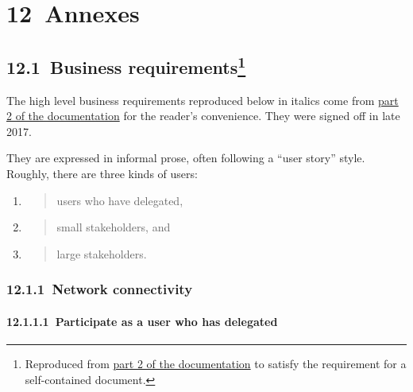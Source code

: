 \documentclass[]{article}
\let\oldparagraph\paragraph
\renewcommand{\paragraph}[1]{\oldparagraph{#1}\mbox{}}
\begin{document}
\hypertarget{annexes}{%
\section{​12​~Annexes}\label{annexes}}

\hypertarget{business-requirements}{%
\subsection[​12.1​~Business
requirements]{\texorpdfstring{​12.1​~Business requirements\footnote{Reproduced
  from
  \href{https://github.com/input-output-hk/ouroboros-network-docs/blob/master/technical-report/network.pdf}{{part
  2 of the documentation}} to satisfy the requirement for a
  self-contained document.}}{​12.1​~Business requirements}}\label{business-requirements}}

The high level business requirements reproduced below in italics come
from
\href{https://github.com/input-output-hk/ouroboros-network-docs/blob/master/technical-report/network.pdf}{{part
2 of the documentation}} for the reader's convenience. They were signed
off in late 2017.

They are expressed in informal prose, often following a ``user story''
style. Roughly, there are three kinds of users:

\begin{enumerate}
\def\labelenumi{\arabic{enumi}.}
\item
  \begin{quote}
  users who have delegated,
  \end{quote}
\item
  \begin{quote}
  small stakeholders, and
  \end{quote}
\item
  \begin{quote}
  large stakeholders.
  \end{quote}
\end{enumerate}

\hypertarget{network-connectivity}{%
\subsubsection{​12.1.1​~Network
connectivity}\label{network-connectivity}}

\hypertarget{participate-as-a-user-who-has-delegated}{%
\paragraph{​12.1.1.1​~Participate as a user who has delegated
}\label{participate-as-a-user-who-has-delegated}}
\end{document}
